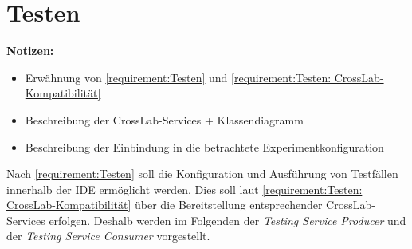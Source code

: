 \section{Testen}\label{section:konzeption:testen}

\begin{note}
    \textbf{Notizen:}
    \begin{itemize}
        \item Erwähnung von \autoref{requirement:Testen} und \autoref{requirement:Testen: CrossLab-Kompatibilität}
        \item Beschreibung der CrossLab-Services + Klassendiagramm
        \item Beschreibung der Einbindung in die betrachtete Experimentkonfiguration
    \end{itemize}
\end{note}

Nach \autoref{requirement:Testen} soll die Konfiguration und Ausführung von Testfällen innerhalb der IDE ermöglicht werden. Dies soll laut \autoref{requirement:Testen: CrossLab-Kompatibilität} über die Bereitstellung entsprechender CrossLab-Services erfolgen. Deshalb werden im Folgenden der \textit{Testing Service Producer} und der \textit{Testing Service Consumer} vorgestellt.


